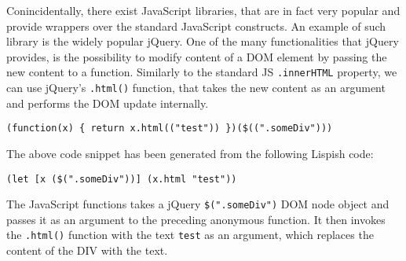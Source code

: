 Conincidentally, there exist JavaScript libraries, that are in fact very popular and provide wrappers over the standard JavaScript constructs.
An example of such library is the widely popular jQuery\cite{jquery}. 
One of the many functionalities that jQuery provides, is the possibility to modify content of a DOM element by passing the new content to a function.
Similarly to the standard JS \texttt{.innerHTML} property, we can use jQuery's \texttt{.html()} function, that takes the new content as an argument and performs the DOM update internally. 

\begin{verbatim}
(function(x) { return x.html(("test")) })($((".someDiv")))
\end{verbatim}

The above code snippet has been generated from the following Lispish code:

\begin{verbatim}
(let [x ($(".someDiv"))] (x.html "test"))
\end{verbatim}

The JavaScript functions takes a jQuery \texttt{\$(".someDiv")} DOM node object and passes it as an argument to the preceding anonymous function.
It then invokes the \texttt{.html()} function with the text \texttt{test} as an argument, which replaces the content of the DIV with the text.


